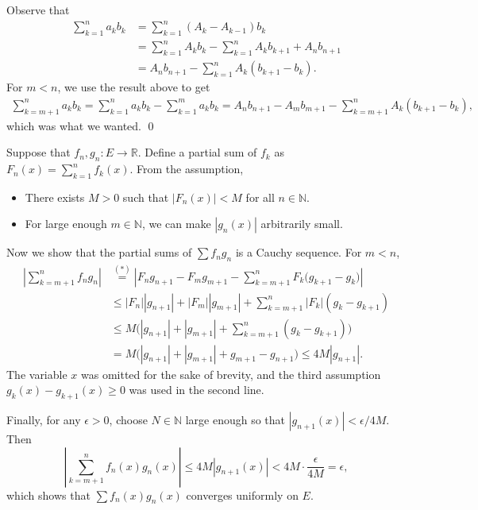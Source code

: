 \documentclass[12pt]{report}
\newcommand{\ds}{\displaystyle}
\newcommand{\abs}[1]{\left| #1 \right|}
\newcommand{\ra}{\rightarrow}
\newcommand{\R}{\mathbb{R}}
\newcommand{\N}{\mathbb{N}}
\begin{document}
\begin{enumerate}
     Observe that
    \[
        \begin{aligned}
            \sum_{k=1}^n a_k b_k & = \sum_{k=1}^n (A_k - A_{k-1})b_k                               \\
                                 & = \sum_{k=1}^n A_k b_k - \sum_{k=1}^n A_k b_{k+1} + A_n b_{n+1} \\
                                 & = A_n b_{n+1} - \sum_{k=1}^n A_k (b_{k+1} - b_k).
        \end{aligned}
    \]
    For \(m < n\), we use the result above to get
    \[
        \begin{aligned}
            \sum_{k=m+1}^n a_k b_k = \sum_{k=1}^n a_k b_k - \sum_{k=1}^m a_k b_k = A_n b_{n+1} - A_m b_{m+1} - \sum_{k=m+1}^n A_k (b_{k+1} - b_k),
        \end{aligned}
    \]
    which was what we wanted. \qed

    Suppose that \(f_n, g_n: E \ra \R\). Define a partial sum of \(f_k\) as \(F_n(x) = \ds \sum_{k=1}^n f_k(x)\). From the assumption,
    \begin{itemize}
        \item There exists \(M > 0\) such that \(\abs{F_n(x)} < M\) for all \(n \in \N\).
        \item For large enough \(m \in \N\), we can make \(\abs{g_n(x)}\) arbitrarily small.
    \end{itemize}
    Now we show that the partial sums of \(\sum f_ng_n\) is a Cauchy sequence. For \(m < n\),
    \[
        \begin{aligned}
            \abs{\sum_{k=m+1}^n f_n g_n} & \overset{(\ast)}{=} \abs{F_n g_{n+1} - F_m g_{m+1} - \sum_{k=m+1}^n F_k \bigl(g_{k+1} - g_k\bigr)} \\
                                         & \leq \abs{F_n}\abs{g_{n+1}} + \abs{F_m}\abs{g_{m+1}} + \sum_{k=m+1}^n \abs{F_k} (g_k - g_{k+1})    \\
                                         & \leq M\bigl(\abs{g_{n+1}} + \abs{g_{m+1}} + \sum_{k=m+1}^n (g_k - g_{k+1})\bigr)                   \\
                                         & = M\bigl(\abs{g_{n+1}} + \abs{g_{m+1}}  + g_{m+1} - g_{n+1}\bigr) \leq 4M \abs{g_{n+1}}.
        \end{aligned}
    \]
    The variable \(x\) was omitted for the sake of brevity, and the third assumption \(g_k(x) - g_{k+1}(x) \geq 0\) was used in the second line.

    Finally, for any \(\epsilon > 0\), choose \(N \in \N\) large enough so that \(\abs{g_{n+1}(x)} < \epsilon/4M\). Then
    \[
        \abs{\sum_{k=m+1}^n f_n(x) g_n(x)} \leq 4M\abs{g_{n+1}(x)} < 4M\cdot\frac{\epsilon}{4M} = \epsilon,
    \]
    which shows that \(\sum f_n(x) g_n(x)\) converges uniformly on \(E\).
\end{enumerate}
\end{document}
